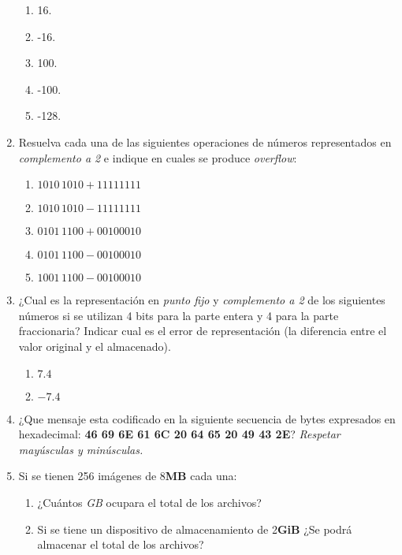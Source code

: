 \documentclass[12pt]{article}
\begin{document}
\begin{enumerate}
\begin{enumerate}
            \item 16.
            \item -16.
            \item 100.
            \item -100.
            \item -128.

        \end{enumerate}

    \item Resuelva cada una de las siguientes operaciones de números
    representados en \emph{complemento a 2} e indique en cuales se produce
    \emph{overflow}:

        \begin{enumerate}

            \item $1010\,1010 + 1111 1111$
            \item $1010\,1010 - 1111 1111$
            \item $0101\,1100 + 0010 0010$
            \item $0101\,1100 - 0010 0010$
            \item $1001\,1100 - 0010 0010$

        \end{enumerate}

    \item ¿Cual es la representación en \emph{punto fijo} y \emph{complemento
        a 2} de los siguientes números si se utilizan 4 bits para la parte
        entera y 4 para la parte fraccionaria? Indicar cual es el error de
        representación (la diferencia entre el valor original y el
        almacenado).

        \begin{enumerate}

            \item $7.4$

            \item $-7.4$

        \end{enumerate}

    \item ¿Que mensaje esta codificado en la siguiente secuencia de bytes
        expresados en hexadecimal: \textbf{46 69 6E 61 6C 20 64 65  20 49 43 2E}?
        \emph{Respetar mayúsculas y minúsculas.}

    \item Si se tienen 256 imágenes de 8\textbf{MB} cada una:

        \begin{enumerate}

            \item ¿Cuántos \emph{GB} ocupara el total de los archivos?

            \item Si se tiene un dispositivo de almacenamiento de
            2\textbf{GiB} ¿Se podrá almacenar el total de los archivos?

        \end{enumerate}

\end{enumerate}
\end{document}
